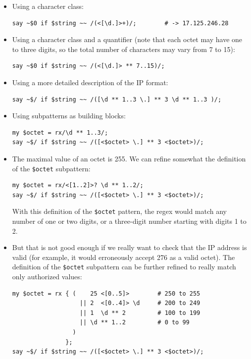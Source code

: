 \begin{itemize} 	

\item Using a character class:

\begin{verbatim}
say ~$0 if $string ~~ /(<[\d.]>+)/;        # -> 17.125.246.28
\end{verbatim}
%

\item Using a character class and a quantifier (note that 
each octet may have one to three digits, so the total number 
of characters may vary from 7 to 15):

\begin{verbatim}
say ~$0 if $string ~~ /(<[\d.]> ** 7..15)/;  
\end{verbatim}
%

\item Using a more detailed description of the IP format:
\begin{verbatim}
say ~$/ if $string ~~ /([\d ** 1..3 \.] ** 3 \d ** 1..3 )/;
\end{verbatim}
%

\item Using subpatterns as building blocks:
\begin{verbatim}
my $octet = rx/\d ** 1..3/;
say ~$/ if $string ~~ /([<$octet> \.] ** 3 <$octet>)/;
\end{verbatim}
%

\item The maximal value of an octet is 255. We can 
refine somewhat the definition of the \verb'$octet' 
subpattern:
\begin{verbatim}
my $octet = rx/<[1..2]>? \d ** 1..2/;
say ~$/ if $string ~~ /([<$octet> \.] ** 3 <$octet>)/;
\end{verbatim}
%
With this definition of the \verb'$octet' pattern, the 
regex would match any number of one or two digits, or a 
three-digit number starting with digits 1 to 2.

\item But that is not good enough if we really want to check 
that the IP address is valid (for example, it would erroneously 
accept 276 as a valid octet). The definition of the 
\verb'$octet' subpattern can be further refined to 
really match only authorized values:

\begin{verbatim}
my $octet = rx { (    25 <[0..5]>        # 250 to 255
                   || 2  <[0..4]> \d     # 200 to 249
                   || 1  \d ** 2         # 100 to 199
                   || \d ** 1..2         # 0 to 99 
                 )
               };
say ~$/ if $string ~~ /([<$octet> \.] ** 3 <$octet>)/;
\end{verbatim}
%


\end{itemize}
